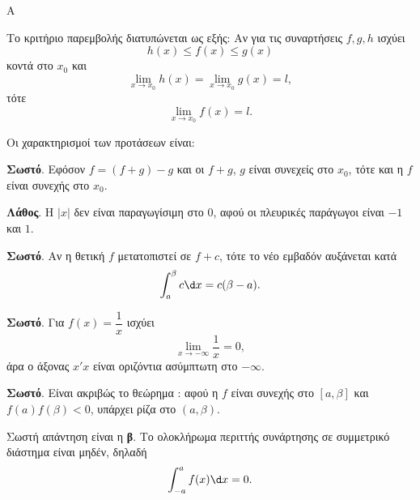 \begin{thema}{Α}
\begin{erwthma}
\item {}

\item Το κριτήριο παρεμβολής διατυπώνεται ως εξής: Αν για τις συναρτήσεις $f,g,h$ ισχύει
\[ h(x)\leq f(x)\leq g(x) \]
κοντά στο $x_0$ και
\[ \lim_{x\to x_0}h(x)=\lim_{x\to x_0}g(x)=l, \]
τότε
\[ \lim_{x\to x_0}f(x)=l. \]

\item {}

\item Οι χαρακτηρισμοί των προτάσεων είναι:
\begin{alist}
\item \textbf{Σωστό}. Εφόσον $f=(f+g)-g$ και οι $f+g$, $g$ είναι συνεχείς στο $x_0$, τότε και η $f$ είναι συνεχής στο $x_0$.
\item \textbf{Λάθος}. Η $|x|$ δεν είναι παραγωγίσιμη στο $0$, αφού οι πλευρικές παράγωγοι είναι $-1$ και $1$.
\item \textbf{Σωστό}. Αν η θετική $f$ μετατοπιστεί σε $f+c$, τότε το νέο εμβαδόν αυξάνεται κατά
\[ \dint_a^\beta c\d x=c(\beta-a). \]
\item \textbf{Σωστό}. Για $f(x)=\dfrac{1}{x}$ ισχύει
\[ \lim_{x\to-\infty}\dfrac{1}{x}=0, \]
άρα ο άξονας $x'x$ είναι οριζόντια ασύμπτωτη στο $-\infty$.
\item \textbf{Σωστό}. Είναι ακριβώς το θεώρημα : αφού η $f$ είναι συνεχής στο $[a,\beta]$ και $f(a)f(\beta)<0$, υπάρχει ρίζα στο $(a,\beta)$.
\end{alist}

\item Σωστή απάντηση είναι η \textbf{β}. Το ολοκλήρωμα περιττής συνάρτησης σε συμμετρικό διάστημα είναι μηδέν, δηλαδή
\[ \dint_{-a}^{a} f(x)\d x=0. \]
\end{erwthma}
\end{thema}


